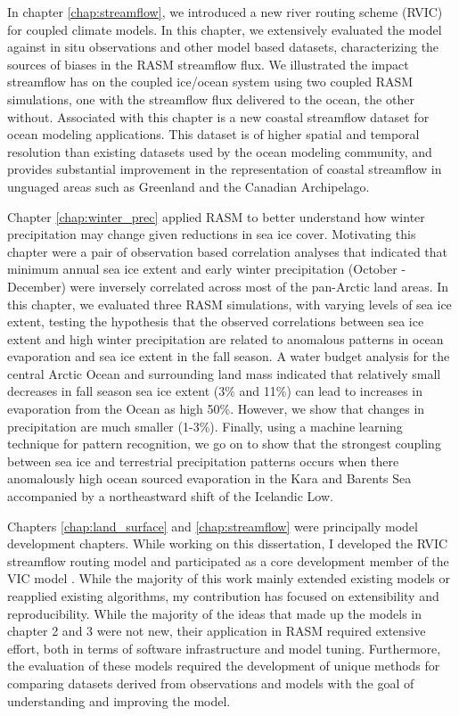 In chapter \ref{chap:streamflow}, we introduced a new river routing scheme (RVIC) for coupled climate models.
In this chapter, we extensively evaluated the model against in situ observations and other model based datasets, characterizing the sources of biases in the RASM streamflow flux.
We illustrated the impact streamflow has on the coupled ice/ocean system using two coupled RASM simulations, one with the streamflow flux delivered to the ocean, the other without.
Associated with this chapter is a new coastal streamflow dataset for ocean modeling applications.
This dataset is of higher spatial and temporal resolution than existing datasets used by the ocean modeling community, and provides substantial improvement in the representation of coastal streamflow in unguaged areas such as Greenland and the Canadian Archipelago.

Chapter \ref{chap:winter_prec} applied RASM to better understand how winter precipitation may change given reductions in sea ice cover.
Motivating this chapter were a pair of observation based correlation analyses that indicated that minimum annual sea ice extent and early winter precipitation (October - December) were inversely correlated across most of the pan-Arctic land areas.
In this chapter, we evaluated three RASM simulations, with varying levels of sea ice extent, testing the hypothesis that the observed correlations between sea ice extent and high winter precipitation are related to anomalous patterns in ocean evaporation and sea ice extent in the fall season.
A water budget analysis for the central Arctic Ocean and surrounding land mass indicated that relatively small decreases in fall season sea ice extent (3\% and 11\%) can lead to increases in evaporation from the Ocean as high 50\%.
However, we show that changes in precipitation are much smaller (1-3\%).
Finally, using a machine learning technique for pattern recognition, we go on to show that the strongest coupling between sea ice and terrestrial precipitation patterns occurs when there anomalously high ocean sourced evaporation in the Kara and Barents Sea accompanied by a northeastward shift of the Icelandic Low.

Chapters \ref{chap:land_surface} and \ref{chap:streamflow} were principally model development chapters.
While working on this dissertation, I developed the RVIC streamflow routing model \citep[see also \ref{sec:rvic_dev} ;][]{Hamman_2015,Hamman_2016b} and participated as a core development member of the VIC model \citep[see also \label{sec:vic_dev}]{Hamman_2016c,Hamman_2016d}.
While the majority of this work mainly extended existing models or reapplied existing algorithms, my contribution has focused on extensibility and reproducibility.
While the majority of the ideas that made up the models in chapter 2 and 3 were not new, their application in RASM required extensive effort, both in terms of software infrastructure and model tuning.
Furthermore, the evaluation of these models required the development of unique methods for comparing datasets derived from observations and models with the goal of understanding and improving the model.

